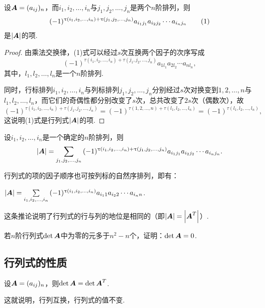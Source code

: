 \begin{lemma}
设\(\boldsymbol{A}=(a_{ij})_n\)，而\(i_1,i_2,\dotsc,i_n\)与\(j_1,j_2,\dotsc,j_n\)是两个\(n\)阶排列，则\begin{gather}
(-1)^{\tau(i_1,i_2,\dotsc,i_n)+\tau(j_1,j_2,\dotsc,j_n)}
	a_{i_1j_1} a_{i_2j_2} \dotsm a_{i_nj_n} \tag1
\end{gather}是\(\abs{\boldsymbol{A}}\)的项.
\begin{proof}
由乘法交换律，(1)式可以经过\(s\)次互换两个因子的次序写成\[
(-1)^{\tau(i_1,i_2,\dotsc,i_n)+\tau(j_1,j_2,\dotsc,j_n)}
	a_{1 l_1} a_{2 l_2} \dotsm a_{n l_n},
\]其中，\(l_1,l_2,\dotsc,l_n\)是一个\(n\)阶排列.

同时，行标排列\(i_1,i_2,\dotsc,i_n\)与列标排列\(j_1,j_2,\dotsc,j_n\)分别经过\(s\)次对换变到\(1,2,\dotsc,n\)与\(l_1,l_2,\dotsc,l_n\)，而它们的奇偶性都分别改变了\(s\)次，总共改变了\(2s\)次（偶数次），故\[
(-1)^{\tau(i_1,i_2,\dotsc,i_n)+\tau(j_1,j_2,\dotsc,j_n)}
= (-1)^{\tau(1,2,\dotsc,n)+\tau(l_1,l_2,\dotsc,l_n)}
= (-1)^{\tau(l_1,l_2,\dotsc,l_n)},
\]这说明(1)式是行列式\(\abs{\boldsymbol{A}}\)的项.
\end{proof}
\end{lemma}

\begin{corollary}
设\(i_1,i_2,\dotsc,i_n\)是一个确定的\(n\)阶排列，则\[
\abs{\boldsymbol{A}} = \sum\limits_{j_1,j_2,\dotsc,j_n}{
	(-1)^{\uptau(i_1,i_2,\dotsc,i_n)+\uptau(j_1,j_2,\dotsc,j_n)} a_{i_1 j_1} a_{i_2 j_2} \dotsm a_{i_n j_n}
}.
\]
\end{corollary}

行列式的项的因子顺序也可按列标的自然序排列，即有：
\begin{corollary}
\(\abs{\boldsymbol{A}} = \sum\limits_{i_1,i_2,\dotsc,i_n}{(-1)^{\uptau(i_1,i_2,\dotsc,i_n)} a_{i_1 1} a_{i_2 2} \dotsm a_{i_n n}}\).
\end{corollary}
这条推论说明了行列式的行与列的地位是相同的（即\(\abs{\boldsymbol{A}} = \abs{\boldsymbol{A}^T}\)）.

\begin{example}
若\(n\)阶行列式\(\det\boldsymbol{A}\)中为零的元多于\(n^2-n\)个，证明：\(\det\boldsymbol{A}=0\).
\end{example}

\subsection{行列式的性质}
\begin{property}\label{theorem:行列式.性质1}
设\(\boldsymbol{A}=(a_{ij})_n\)，则\(\det \boldsymbol{A}=\det \boldsymbol{A}^T\).
\end{property}
这就说明，行列互换，行列式的值不变.


